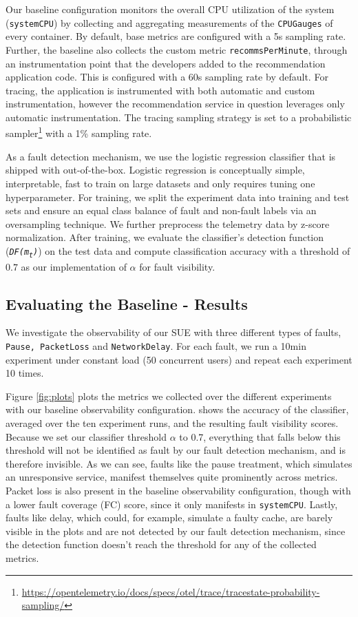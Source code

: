 Our baseline configuration monitors the overall CPU utilization of the system (\texttt{systemCPU}) by collecting and aggregating measurements of the \texttt{CPUGauges} of every container. By default, base metrics are configured with a 5s sampling rate.  Further, the baseline also collects the custom metric \texttt{recommsPerMinute}, through an instrumentation point that the developers added to the recommendation application code. This is configured with a 60s sampling rate by default. For tracing, the application is instrumented with both automatic and custom instrumentation, however the recommendation service in question leverages only automatic instrumentation. The tracing sampling strategy is set to a probabilistic sampler\footnote{\url{https://opentelemetry.io/docs/specs/otel/trace/tracestate-probability-sampling/}} with a 1\% sampling rate.


As a fault detection mechanism, we use the logistic regression classifier that is shipped with \name{} out-of-the-box. Logistic regression is conceptually simple, interpretable,  fast to train on large datasets and
only requires tuning one hyperparameter. %
For training, we split
the experiment data into training and test sets and ensure an equal class balance of fault and non-fault labels via an oversampling technique. %
We further preprocess the telemetry data by z-score normalization. %
After training, we evaluate the classifier's detection function (\textit{\texttt{DF(m\textsubscript{t})}}) on the test data and compute classification accuracy 
with a threshold of $0.7$  as our implementation of $\alpha$ for fault visibility. 

\subsection{Evaluating the Baseline - Results}
We investigate the observability of our SUE with three different types of faults, \texttt{Pause, PacketLoss} and \texttt{NetworkDelay}. For each fault, we run a 10min experiment under constant load (50 concurrent users) and repeat each experiment 10 times.

Figure \ref{fig:plots} plots the metrics we collected over the different experiments with our baseline observability configuration. %
 shows the accuracy of the classifier, averaged over the ten experiment runs, and the resulting fault visibility scores. Because we set our classifier threshold $\alpha$ to 0.7, everything that falls below this threshold will not be identified as fault by our fault detection mechanism, and is therefore invisible.
As we can see, faults like the pause treatment, which simulates an unresponsive service, 
manifest themselves quite prominently across metrics. 
Packet loss is also present in the baseline observability configuration, though with a lower fault coverage (FC) score, since it only manifests in \texttt{systemCPU}. Lastly, faults like delay, which could, for example, simulate a faulty cache, are barely visible in the plots and are not detected by our fault detection mechanism, since the detection function doesn't reach the threshold for any of the collected metrics.

